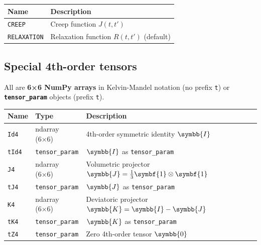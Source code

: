 \documentclass[
  a4paper,
  numbers=noendperiod,
  DIV=12]{scrreprt}
\newcounter{none} %
\newcommand{\uu}[1]{{\symbf{{#1}}}}
\newcommand{\uuuu}[1]{{\symbb{{#1}}}}
\begin{document}
{\def\LTcaptype{none} %
\begin{longtable}[]{@{}ll@{}}
\toprule\noalign{}
Name & Description \\
\midrule\noalign{}
\endhead
\bottomrule\noalign{}
\endlastfoot
\texttt{CREEP} & Creep function \(J(t,t')\) \\
\texttt{RELAXATION} & Relaxation function \(R(t,t')\) (default) \\
\end{longtable}
}

\subsection{Special 4th-order tensors}\label{special-4th-order-tensors}

All are \textbf{6×6 NumPy arrays} in Kelvin-Mandel notation (no prefix
\texttt{t}) or \textbf{\texttt{tensor\_param}} objects (prefix
\texttt{t}).

{\def\LTcaptype{none} %
\begin{longtable}[]{@{}
  >{\raggedright\arraybackslash}p{}
  >{\raggedright\arraybackslash}p{}
  >{\raggedright\arraybackslash}p{}@{}}
\toprule\noalign{}
\begin{minipage}[b]{\linewidth}\raggedright
Name
\end{minipage} & \begin{minipage}[b]{\linewidth}\raggedright
Type
\end{minipage} & \begin{minipage}[b]{\linewidth}\raggedright
Description
\end{minipage} \\
\midrule\noalign{}
\endhead
\bottomrule\noalign{}
\endlastfoot
\texttt{Id4} & ndarray (6×6) & 4th-order symmetric identity
\(\uuuu{I}\) \\
\texttt{tId4} & \texttt{tensor\_param} & \(\uuuu{I}\) as
\texttt{tensor\_param} \\
\texttt{J4} & ndarray (6×6) & Volumetric projector
\(\uuuu{J}=\frac{1}{3}\uu{1}\otimes\uu{1}\) \\
\texttt{tJ4} & \texttt{tensor\_param} & \(\uuuu{J}\) as
\texttt{tensor\_param} \\
\texttt{K4} & ndarray (6×6) & Deviatoric projector
\(\uuuu{K}=\uuuu{I}-\uuuu{J}\) \\
\texttt{tK4} & \texttt{tensor\_param} & \(\uuuu{K}\) as
\texttt{tensor\_param} \\
\texttt{tZ4} & \texttt{tensor\_param} & Zero 4th-order tensor
\(\uuuu{0}\) \\
\end{longtable}
}
\end{document}
